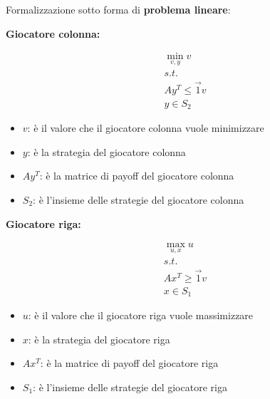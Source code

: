 Formalizzazione sotto forma di \textbf{problema lineare}:

\begin{minipage}{0.5\textwidth}
    \textbf{Giocatore colonna:}

    \begin{equation}
        \begin{aligned}
            \min_{v,y} v       \\
            s.t.               \\
            Ay^T \leq \vec{1}v \\
            y \in S_2
        \end{aligned}
    \end{equation}
\end{minipage}
\begin{minipage}{0.5\textwidth}
    \begin{itemize}
        \item $v$: è il valore che il giocatore colonna vuole minimizzare
        \item $y$: è la strategia del giocatore colonna
        \item $Ay^T$: è la matrice di payoff del giocatore colonna
        \item $S_2$: è l'insieme delle strategie del giocatore colonna
    \end{itemize}
\end{minipage}

\begin{minipage}{0.5\textwidth}
    \textbf{Giocatore riga:}

    \begin{equation}
        \begin{aligned}
            \max_{u,x} u       \\
            s.t.               \\
            Ax^T \geq \vec{1}v \\
            x \in S_1
        \end{aligned}
    \end{equation}
\end{minipage}
\begin{minipage}{0.5\textwidth}
    \begin{itemize}
        \item $u$: è il valore che il giocatore riga vuole massimizzare
        \item $x$: è la strategia del giocatore riga
        \item $Ax^T$: è la matrice di payoff del giocatore riga
        \item $S_1$: è l'insieme delle strategie del giocatore riga
    \end{itemize}
\end{minipage}


